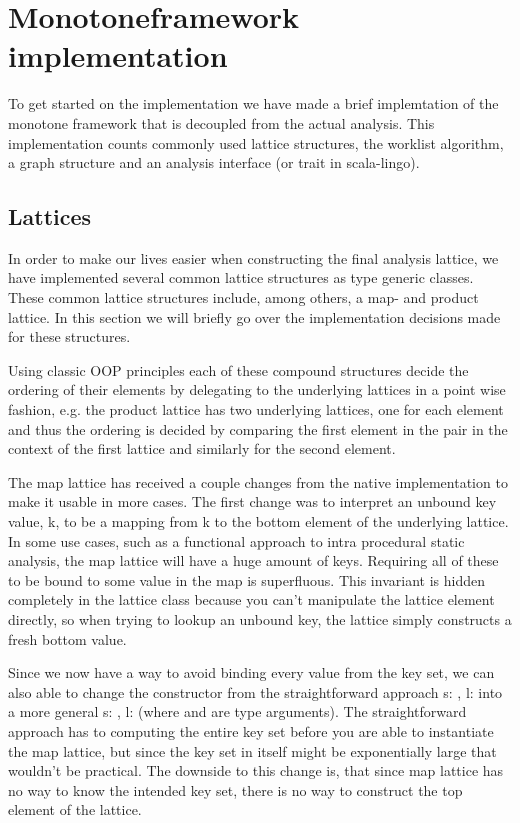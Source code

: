 \chapter{Monotoneframework implementation}

To get started on the implementation we have made a brief implemtation of the monotone framework that is decoupled from the actual analysis.
This implementation counts commonly used lattice structures, the worklist algorithm, a graph structure and an analysis interface (or trait in scala-lingo).

\section{Lattices}

In order to make our lives easier when constructing the final analysis lattice, we have implemented several common lattice structures as type generic classes. These common lattice structures include, among others, a map- and product lattice. In this section we will briefly go over the implementation decisions made for these structures.

Using classic OOP principles each of these compound structures decide the ordering of their elements by delegating to the underlying lattices in a point wise fashion, e.g. the product lattice has two underlying lattices, one for each element and thus the ordering is decided by comparing the first element in the pair in the context of the first lattice and similarly for the second element.

The map lattice has received a couple changes from the native implementation to make it usable in more cases. The first change was to interpret an unbound key value, k, to be a mapping from k to the bottom element of the underlying lattice. In some use cases, such as a functional approach to intra procedural static analysis, the map lattice will have a huge amount of keys. Requiring all of these to be bound to some value in the map is superfluous. This invariant is hidden completely in the lattice class because you can't manipulate the lattice element directly, so when trying to lookup an unbound key, the lattice simply constructs a fresh bottom value.

Since we now have a way to avoid binding every value from the key set, we can also able to change the constructor from the straightforward approach s: , l:  into a more general s: , l:  (where  and  are type arguments). The straightforward approach has to computing the entire key set before you are able to instantiate the map lattice, but since the key set in itself might be exponentially large that wouldn't be practical. The downside to this change is, that since map lattice has no way to know the intended key set, there is no way to construct the top element of the lattice.

